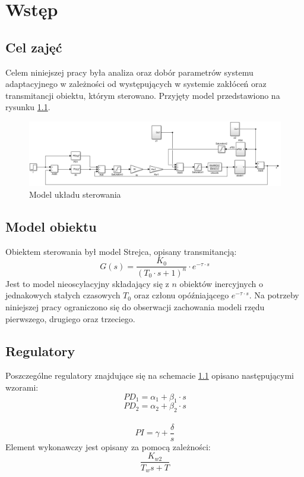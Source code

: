 \chapter{Wstęp}

\section{Cel zajęć}
Celem niniejszej pracy była analiza oraz dobór parametrów systemu adaptacyjnego w zależności od występujących w systemie zakłóceń oraz transmitancji obiektu, którym sterowano. Przyjęty model przedstawiono na rysunku \ref{model_systemu}.

\begin{figure}[h!]
	\centering
	\includegraphics[scale = 0.6]{fig/model_systemu.png}
	\caption		
	{Model układu sterowania}
	\label{model_systemu}
\end{figure} 

\section{Model obiektu}

Obiektem sterowania był model Strejca, opisany  transmitancją:
\begin{equation}\label{key}
G(s) = \dfrac{K_0}{(T_0 \cdot s + 1)^n} \cdot e^{-\tau \cdot s} 
\end{equation}
Jest to model nieoscylacyjny składający się z $n$ obiektów inercyjnych o jednakowych stałych czasowych $T_{0}$ oraz członu opóźniającego $e^{-\tau \cdot s}$. Na potrzeby niniejszej pracy ograniczono się do obserwacji zachowania modeli rzędu pierwszego, drugiego oraz trzeciego. 

\section{Regulatory}
Poszczególne regulatory znajdujące się na schemacie \ref{model_systemu} opisano następującymi wzorami: 
\begin{equation}\label{reg1}
PD_1 = \alpha_1+\beta_1 \cdot s
\end{equation}
\begin{equation}\label{reg2}
PD_2 = \alpha_2+\beta_2 \cdot s
\end{equation}\\
\begin{equation}\label{reg3}
PI = \gamma + \dfrac{\delta}{s}
\end{equation}
Element wykonawczy jest opisany za pomocą zależności:
\begin{equation}\label{actuator}
\dfrac{K_{w2}}{T_w s+T}
\end{equation}

